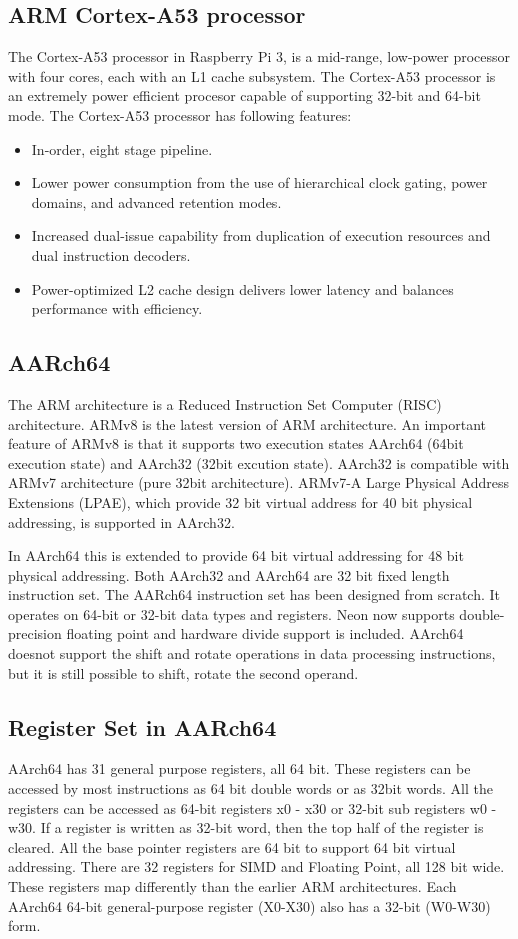 \documentclass[journal]{IEEEtran}
\begin{document}
\subsection{ARM Cortex-A53 processor}
The Cortex-A53 processor in Raspberry Pi 3, is a mid-range, low-power processor with four cores, each with an L1 cache subsystem. The Cortex-A53 processor is an extremely power efficient procesor capable of supporting 32-bit and 64-bit mode.
The Cortex-A53 processor has following features:
\begin{itemize}
	\item In-order, eight stage pipeline.
	\item Lower power consumption from the use of hierarchical clock gating, power domains, and advanced retention modes.
	\item Increased dual-issue capability from duplication of execution resources and dual instruction decoders.
	\item Power-optimized L2 cache design delivers lower latency and balances performance with efficiency.
\end{itemize}

\subsection{AARch64}
The ARM architecture is a Reduced Instruction Set Computer (RISC) architecture. ARMv8 is the latest version of ARM architecture.  An important feature of ARMv8 is that it supports two execution states AArch64 (64bit execution state) and AArch32 (32bit excution state).  AArch32 is compatible with ARMv7 architecture (pure 32bit architecture).  ARMv7-A Large Physical Address Extensions (LPAE), which provide 32 bit virtual address for 40 bit physical addressing, is supported in AArch32.

In AArch64 this is extended to provide 64 bit virtual addressing for 48 bit physical addressing.  Both AArch32 and AArch64 are 32 bit fixed length instruction set.  The AARch64 instruction set has been designed from scratch.  It operates on 64-bit or 32-bit data types and registers.  Neon now supports double-precision floating point and hardware divide support is included.  AArch64 doesnot support the shift and rotate operations in data processing instructions,  but it is still possible to shift, rotate the second operand.

\subsection{Register Set in AARch64}
AArch64 has 31 general purpose registers, all 64 bit.  These registers can be accessed by most instructions as 64 bit double words or as 32bit words.  All the registers can be accessed as 64-bit registers x0 - x30 or 32-bit sub registers w0 - w30.  If a register is written as 32-bit word, then the top half of the register is cleared.  All the base pointer registers are 64 bit to support 64 bit virtual addressing.  There are 32 registers for SIMD and Floating Point, all 128 bit wide.  These registers map differently than the earlier ARM architectures. Each AArch64 64-bit general-purpose register (X0-X30) also has a 32-bit (W0-W30) form.
\end{document}
